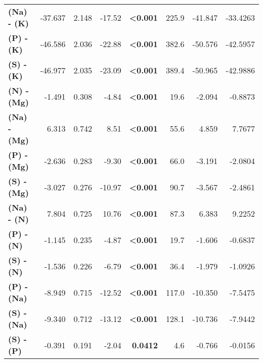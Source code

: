 \begin{table}[H]
\begin{tabular}[t]{>{}lrrr>{}rrrr}
\textbf{(Na) - (K)} & -37.637 & 2.148 & -17.52 & \textbf{<0.001} & 225.9 & -41.847 & -33.4263\\
\textbf{(P) - (K)} & -46.586 & 2.036 & -22.88 & \textbf{<0.001} & 382.6 & -50.576 & -42.5957\\
\textbf{(S) - (K)} & -46.977 & 2.035 & -23.09 & \textbf{<0.001} & 389.4 & -50.965 & -42.9886\\
\textbf{(N) - (Mg)} & -1.491 & 0.308 & -4.84 & \textbf{<0.001} & 19.6 & -2.094 & -0.8873\\
\textbf{(Na) - (Mg)} & 6.313 & 0.742 & 8.51 & \textbf{<0.001} & 55.6 & 4.859 & 7.7677\\
\textbf{(P) - (Mg)} & -2.636 & 0.283 & -9.30 & \textbf{<0.001} & 66.0 & -3.191 & -2.0804\\
\textbf{(S) - (Mg)} & -3.027 & 0.276 & -10.97 & \textbf{<0.001} & 90.7 & -3.567 & -2.4861\\
\textbf{(Na) - (N)} & 7.804 & 0.725 & 10.76 & \textbf{<0.001} & 87.3 & 6.383 & 9.2252\\
\textbf{(P) - (N)} & -1.145 & 0.235 & -4.87 & \textbf{<0.001} & 19.7 & -1.606 & -0.6837\\
\textbf{(S) - (N)} & -1.536 & 0.226 & -6.79 & \textbf{<0.001} & 36.4 & -1.979 & -1.0926\\
\textbf{(P) - (Na)} & -8.949 & 0.715 & -12.52 & \textbf{<0.001} & 117.0 & -10.350 & -7.5475\\
\textbf{(S) - (Na)} & -9.340 & 0.712 & -13.12 & \textbf{<0.001} & 128.1 & -10.736 & -7.9442\\
\textbf{(S) - (P)} & -0.391 & 0.191 & -2.04 & \textbf{0.0412} & 4.6 & -0.766 & -0.0156\\
\bottomrule
\end{tabular}
\end{table}
